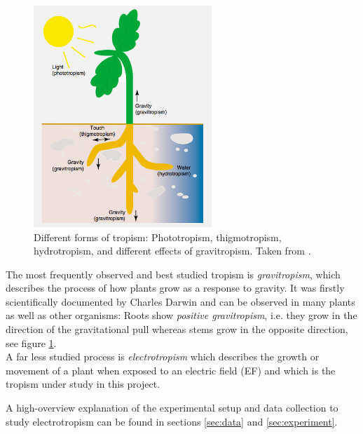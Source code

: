 \begin{figure}[H]
	\centering
	\includegraphics[width=0.6\textwidth]{../Figures/tropism.png}
	\caption{Different forms of tropism: Phototropism, thigmotropism, hydrotropism, and different effects of gravitropism. Taken from \cite{gilroy2008plant}.}
	\label{fig:tropism}
\end{figure}

The most frequently observed and best studied tropism is \textit{gravitropism}, which describes the process of how plants grow as a response to gravity. It was firstly scientifically documented by Charles Darwin \cite{nick2017} and can be observed in many plants as well as other organisms: Roots show \textit{positive gravitropism}, i.e. they grow in the direction of the gravitational pull whereas stems grow in the opposite direction, see figure \ref{fig:tropism}. 
\\
A far less studied process is \textit{electrotropism} which describes the growth or movement of a plant when exposed to an electric field (EF) and which is the tropism under study in this project. 

A high-overview explanation of the experimental setup and data collection to study electrotropism can be found in sections \ref{sec:data} and \ref{sec:experiment}.

